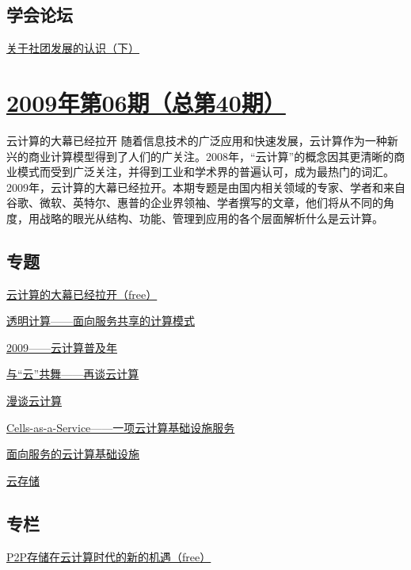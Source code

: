 \documentclass[a4paper]{article}
\begin{document}
\subsection{学会论坛}
\href{http://history.ccf.org.cn/resources/1190201776262/2010/04/15/041092.pdf}{关于社团发展的认识（下）}


\section{\href{http://history.ccf.org.cn/sites/ccf/jsjtbbd.jsp?contentId=2542567629037}{\textbf{2009年第06期（总第40期）}}}
云计算的大幕已经拉开 随着信息技术的广泛应用和快速发展，云计算作为一种新兴的商业计算模型得到了人们的广关注。2008年，“云计算”的概念因其更清晰的商业模式而受到广泛关注，并得到工业和学术界的普遍认可，成为最热门的词汇。2009年，云计算的大幕已经拉开。本期专题是由国内相关领域的专家、学者和来自谷歌、微软、英特尔、惠普的企业界领袖、学者撰写的文章，他们将从不同的角度，用战略的眼光从结构、功能、管理到应用的各个层面解析什么是云计算。
\subsection{专题}
\href{http://history.ccf.org.cn/resources/1190201776262/2010/04/15/040006.pdf}{云计算的大幕已经拉开（free）}

\href{http://history.ccf.org.cn/resources/1190201776262/2010/04/15/040008.pdf}{透明计算——面向服务共享的计算模式}

\href{http://history.ccf.org.cn/resources/1190201776262/2010/04/15/040016.pdf}{2009——云计算普及年}

\href{http://history.ccf.org.cn/resources/1190201776262/2010/04/15/040018.pdf}{与“云”共舞——再谈云计算}

\href{http://history.ccf.org.cn/resources/1190201776262/2010/04/15/040022.pdf}{漫谈云计算}

\href{http://history.ccf.org.cn/resources/1190201776262/2010/04/15/040026.pdf}{Cells-as-a-Service——一项云计算基础设施服务}

\href{http://history.ccf.org.cn/resources/1190201776262/2010/04/15/040032.pdf}{面向服务的云计算基础设施}

\href{http://history.ccf.org.cn/resources/1190201776262/2010/04/15/040044.pdf}{云存储}

\subsection{专栏}
\href{http://history.ccf.org.cn/resources/1190201776262/2010/04/15/040054.pdf}{P2P存储在云计算时代的新的机遇（free）}
\end{document}

